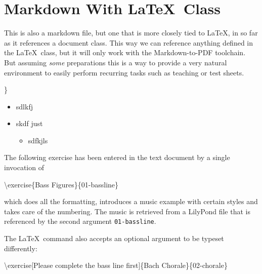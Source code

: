 \documentclass[
]{mecExercise}
\author{}
\date{}
\newenvironment{Shaded}{}{}
\newcommand{\FunctionTok}[1]{\textcolor[rgb]{0.02,0.16,0.49}{#1}}
\newcommand{\NormalTok}[1]{#1}
\providecommand{\tightlist}{%
  \setlength{\itemsep}{0pt}\setlength{\parskip}{0pt}}
\begin{document}
\hypertarget{markdown-with-class}{%
\section{\texorpdfstring{Markdown With
\LaTeX~Class}{Markdown With ~Class}}\label{markdown-with-class}}

This is also a markdown file, but one that is more closely tied to
\LaTeX, in so far as it references a document class. This way we can
reference anything defined in the \LaTeX~class, but it will only work
with the Markdown-to-PDF toolchain. But assuming \emph{some}
preparations this is a way to provide a very natural environment to
easily perform recurring tasks such as teaching or test sheets.

 \}

\begin{itemize}
\tightlist
\item
  sdlkfj
\item
  skdf just

  \begin{itemize}
  \tightlist
  \item
    sdfkjls
  \end{itemize}
\end{itemize}

The following exercise has been entered in the text document by a single
invocation of

\begin{Shaded}
\begin{Highlighting}[]
\FunctionTok{\textbackslash{}exercise}\NormalTok{\{Bass Figures\}\{01{-}bassline\}}
\end{Highlighting}
\end{Shaded}

which does all the formatting, introduces a music example with certain
styles and takes care of the numbering. The music is retrieved from a
LilyPond file that is referenced by the second argument
\texttt{01-bassline}.


The \LaTeX~command also accepts an optional argument to be typeset
differently:

\begin{Shaded}
\begin{Highlighting}[]
\FunctionTok{\textbackslash{}exercise}\NormalTok{[Please complete the bass line first]\{Bach Chorale\}\{02{-}chorale\}}
\end{Highlighting}
\end{Shaded}
\end{document}
